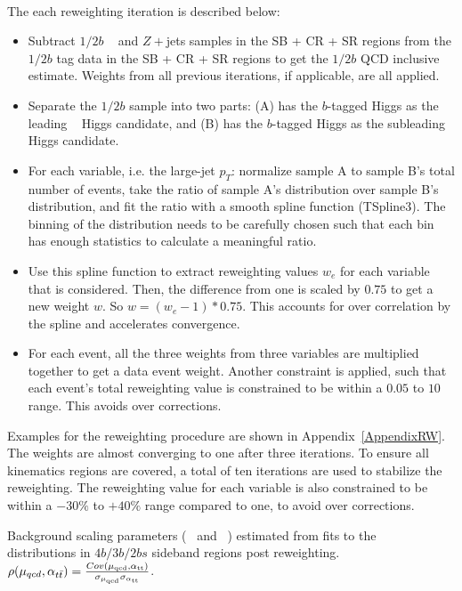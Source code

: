 \paragraph{}
The each reweighting iteration is described below:
\begin{itemize}
  \item Subtract $1/2b$ \ttbar~ and $Z+$jets samples in the SB + CR + SR regions from the $1/2b$ tag data in the SB + CR + SR regions to get the $1/2b$ QCD inclusive estimate. Weights from all previous iterations, if applicable, are all applied.
  \item Separate the $1/2b$ sample into two parts: (A) has the $b$-tagged Higgs as the leading \pt~ Higgs candidate, and (B) has the $b$-tagged Higgs as the subleading \pt~ Higgs candidate.
  \item For each variable, i.e. the large-\R jet $p_{T}$: normalize sample A to sample B's total number of events, take the ratio of sample A's distribution over sample B's distribution, and fit the ratio with a smooth spline function (TSpline3). The binning of the distribution needs to be carefully chosen such that each bin has enough statistics to calculate a meaningful ratio.
  \item Use this spline function to extract reweighting values $w_{e}$ for each variable that is considered. Then, the difference from one is scaled by $0.75$ to get a new weight $w$. So $w = (w_{e} - 1) * 0.75$. This accounts for over correlation by the spline and accelerates convergence.
  \item For each event, all the three weights from three variables are multiplied together to get a data event weight. Another constraint is applied, such that each event's total reweighting value is constrained to be within a $0.05$ to $10$ range. This avoids over corrections.
\end{itemize}
Examples for the reweighting procedure are shown in Appendix~\ref{AppendixRW}.
The weights are almost converging to one after three iterations.
To ensure all kinematics regions are covered, a total of ten iterations are used to stabilize the reweighting. 
The reweighting value for each variable is also constrained to be within a $-30\%$ to $+40\%$ range compared to one, to avoid over corrections.

\begin{table}[htb!]
\begin{center}
\caption{Background scaling parameters (\muqcd~ and \alphatt~) estimated from fits to the \mleadJ~ distributions in $4b/3b/2bs$ sideband regions post reweighting. $\rho(\mu_{qcd},\alpha_{t\bar{t}}) = \frac{Cov(\rm \mu_{qcd},\rm \alpha_{\rm tt})}{\rm \sigma_{\mu_{qcd}} \rm \sigma_{\alpha_{\rm tt}} }$.}

\label{tab:bkgfit}
\end{center}
\end{table}

